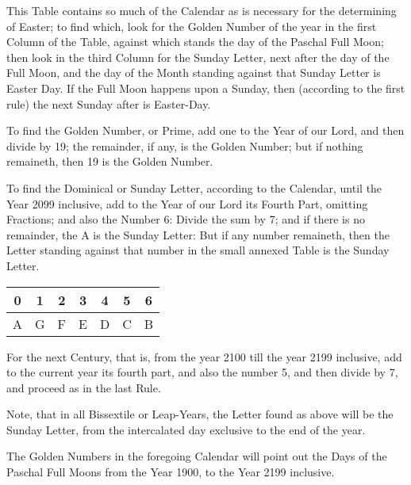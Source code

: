 {\begin{multicols}{2}
This Table contains so much of the Calendar as is necessary for the determining of Easter; to find which, look for the Golden Number of the year in the first Column of the Table, against which stands the day of the Paschal Full Moon; then look in the third Column for the Sunday Letter, next after the day of the Full Moon, and the day of the Month standing against that Sunday Letter is Easter Day. If the Full Moon happens upon a Sunday, then (according to the first rule) the next Sunday after is Easter-Day.

To find the Golden Number, or Prime, add one to the Year of our Lord, and then divide by 19; the remainder, if any, is the Golden Number; but if nothing remaineth, then 19 is the Golden Number.

To find the Dominical or Sunday Letter, according to the Calendar, until the Year 2099 inclusive, add to the Year of our Lord its Fourth Part, omitting Fractions; and also the Number 6: Divide the sum by 7; and if there is no remainder, the A is the Sunday Letter: But if any number remaineth, then the Letter standing against that number in the small annexed Table is the Sunday Letter.
\vspace{6pt}

{\centering\setlength{\extrarowheight}{2pt}\begin{tabular} { | c c c c c c c | }
\hline
0 & 1 & 2 & 3 & 4 & 5 & 6 \\
\hline
A & G & F & E & D & C & B \\
\hline
\end{tabular}\par}

\vspace{2pt}
For the next Century, that is, from the year 2100 till the year 2199 inclusive, add to the current year its fourth part, and also the number 5, and then divide by 7, and proceed as in the last Rule.

Note, that in all Bissextile or Leap-Years, the Letter found as above will be the Sunday Letter, from the intercalated day exclusive to the end of the year.

The Golden Numbers in the foregoing Calendar will point out the Days of the Paschal Full Moons from the Year 1900, to the Year 2199 inclusive.
\vspace{12pt}
\end{multicols}}
